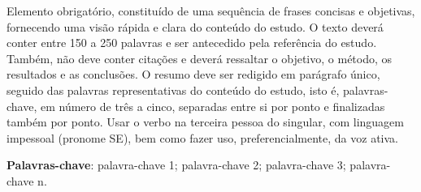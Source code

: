 \setlength{\absparsep}{18pt} %
\begin{resumo}
	
	Elemento obrigatório, constituído de uma sequência de frases concisas e objetivas, fornecendo uma visão rápida e clara do conteúdo do estudo. O texto deverá conter entre 150 a 250 palavras e ser antecedido pela referência do estudo. Também, não deve conter citações e deverá ressaltar o objetivo, o método, os resultados e as conclusões. O resumo deve ser redigido em parágrafo único, seguido das palavras representativas do conteúdo do estudo, isto é, palavras-chave, em número de três a cinco, separadas entre si por ponto e finalizadas também por ponto. Usar o verbo na terceira pessoa do singular, com linguagem impessoal (pronome SE), bem como fazer uso, preferencialmente, da voz ativa.
	
	\vspace{\onelineskip}
	
	\textbf{Palavras-chave}: palavra-chave 1; palavra-chave 2; palavra-chave 3; palavra-chave n.
	
\end{resumo}